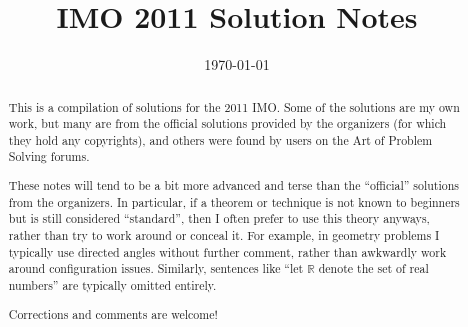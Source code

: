 \documentclass[11pt]{scrartcl}
\title{IMO 2011 Solution Notes}
\date{\today}
\begin{document}
\maketitle

\begin{abstract}
This is a compilation of solutions
for the 2011 IMO.
Some of the solutions are my own work,
but many are from the official solutions provided by the organizers
(for which they hold any copyrights),
and others were found by users on the Art of Problem Solving forums.

These notes will tend to be a bit more advanced and terse than the ``official''
solutions from the organizers.
In particular, if a theorem or technique is not known to beginners
but is still considered ``standard'', then I often prefer to
use this theory anyways, rather than try to work around or conceal it.
For example, in geometry problems I typically use directed angles
without further comment, rather than awkwardly work around configuration issues.
Similarly, sentences like ``let $\mathbb{R}$ denote the set of real numbers''
are typically omitted entirely.

Corrections and comments are welcome!
\end{abstract}

\tableofcontents
\newpage

\addtocounter{section}{-1}
\end{document}
